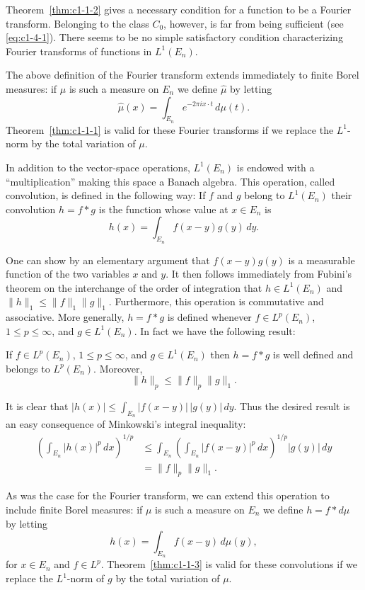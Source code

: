 Theorem~\ref{thm:c1-1-2} gives a necessary condition for a function to be a
Fourier transform. Belonging to the class $C_{0}$, however, is far from being
sufficient (see \eqref{eq:c1-4-1}). There seems to be no simple satisfactory
condition characterizing Fourier transforms of functions in $L^{1}(E_{n})$.

The above definition of the Fourier transform extends immediately to finite
Borel measures: if $\mu$ is such a measure on $E_{n}$ we define $\hat{\mu}$ by
letting
\[
\hat{\mu}(x)=\int_{E_{n}}e^{-2\pi i x\cdot t}\,d\mu(t).
\]
Theorem~\ref{thm:c1-1-1} is valid for these Fourier transforms if we replace the
$L^{1}$-norm by the total variation of $\mu$.

In addition to the vector-space operations, $L^{1}(E_{n})$ is endowed with a
``multiplication'' making this space a Banach algebra. This operation, called
convolution, is defined in the following way: If $f$ and $g$ belong to
$L^{1}(E_{n})$ their convolution $h = f * g$ is the function whose value at
$x \in E_{n}$ is
\[
h(x)=\int_{E_{n}}f(x-y)g(y)\,dy.
\]

One can show by an elementary argument that $f(x - y)g(y)$ is a measurable
function of the two variables $x$ and $y$. It then follows immediately from
Fubini's theorem on the interchange of the order of integration that
$h \in L^{1}(E_{n})$ and $\|h\|_{1} \leq \|f\|_{1}\|g\|_{1}$. Furthermore, this
operation is commutative and associative. More generally, $h = f * g$ is
defined whenever $f \in L^{p}(E_{n})$, $1 \leq p \leq \infty$, and
$g \in L^{1}(E_{n})$. In fact we have the following result:

\begin{theorem}\label{thm:c1-1-3}
If $f \in L^{p}(E_{n})$, $1 \leq p \leq \infty$, and $g \in L^{1}(E_{n})$ then
$h = f * g$ is well defined and belongs to $L^{p}(E_{n})$. Moreover,
\[
\|h\|_{p}\leq\|f\|_{p}\|g\|_{1}.
\]
\end{theorem}

It is clear that
$|h(x)| \leq \int_{E_{n}} |f(x - y)| \, |g(y)| \, dy$. Thus the desired result
is an easy consequence of Minkowski's integral inequality:
\begin{align*}
\left(\int_{E_{n}}|h(x)|^{p}\,dx\right)^{1/p}
&\leq\int_{E_{n}}\left(\int_{E_{n}}|f(x-y)|^{p}\,dx\right)^{1/p}|g(y)|\,dy\\
&=\|f\|_{p}\|g\|_{1}.
\end{align*}

As was the case for the Fourier transform, we can extend this operation to
include finite Borel measures: if $\mu$ is such a measure on $E_{n}$ we define
$h = f * d\mu$ by letting
\[
h(x)=\int_{E_{n}}f(x-y)\,d\mu(y),
\]
for $x \in E_{n}$ and $f \in L^{p}$. Theorem~\ref{thm:c1-1-3} is valid for these
convolutions if we replace the $L^{1}$-norm of $g$ by the total variation of
$\mu$.

